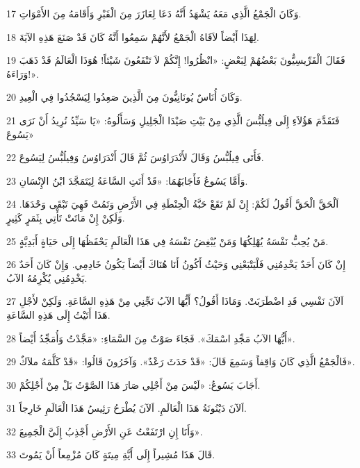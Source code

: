 \par 17 وَكَانَ الْجَمْعُ الَّذِي مَعَهُ يَشْهَدُ أَنَّهُ دَعَا لِعَازَرَ مِنَ الْقَبْرِ وَأَقَامَهُ مِنَ الأَمْوَاتِ.
\par 18 لِهَذَا أَيْضاً لاَقَاهُ الْجَمْعُ لأَنَّهُمْ سَمِعُوا أَنَّهُ كَانَ قَدْ صَنَعَ هَذِهِ الآيَةَ.
\par 19 فَقَالَ الْفَرِّيسِيُّونَ بَعْضُهُمْ لِبَعْضٍ: «انْظُرُوا! إِنَّكُمْ لاَ تَنْفَعُونَ شَيْئاً! هُوَذَا الْعَالَمُ قَدْ ذَهَبَ وَرَاءَهُ!».
\par 20 وَكَانَ أُنَاسٌ يُونَانِيُّونَ مِنَ الَّذِينَ صَعِدُوا لِيَسْجُدُوا فِي الْعِيدِ.
\par 21 فَتَقَدَّمَ هَؤُلاَءِ إِلَى فِيلُبُّسَ الَّذِي مِنْ بَيْتِ صَيْدَا الْجَلِيلِ وَسَأَلُوهُ: «يَا سَيِّدُ نُرِيدُ أَنْ نَرَى يَسُوعَ»
\par 22 فَأَتَى فِيلُبُّسُ وَقَالَ لأَنْدَرَاوُسَ ثُمَّ قَالَ أَنْدَرَاوُسُ وَفِيلُبُّسُ لِيَسُوعَ.
\par 23 وَأَمَّا يَسُوعُ فَأَجَابَهُمَا: «قَدْ أَتَتِ السَّاعَةُ لِيَتَمَجَّدَ ابْنُ الإِنْسَانِ.
\par 24 اَلْحَقَّ الْحَقَّ أَقُولُ لَكُمْ: إِنْ لَمْ تَقَعْ حَبَّةُ الْحِنْطَةِ فِي الأَرْضِ وَتَمُتْ فَهِيَ تَبْقَى وَحْدَهَا. وَلَكِنْ إِنْ مَاتَتْ تَأْتِي بِثَمَرٍ كَثِيرٍ.
\par 25 مَنْ يُحِبُّ نَفْسَهُ يُهْلِكُهَا وَمَنْ يُبْغِضُ نَفْسَهُ فِي هَذَا الْعَالَمِ يَحْفَظُهَا إِلَى حَيَاةٍ أَبَدِيَّةٍ.
\par 26 إِنْ كَانَ أَحَدٌ يَخْدِمُنِي فَلْيَتْبَعْنِي وَحَيْثُ أَكُونُ أَنَا هُنَاكَ أَيْضاً يَكُونُ خَادِمِي. وَإِنْ كَانَ أَحَدٌ يَخْدِمُنِي يُكْرِمُهُ الآبُ.
\par 27 اَلآنَ نَفْسِي قَدِ اضْطَرَبَتْ. وَمَاذَا أَقُولُ؟ أَيُّهَا الآبُ نَجِّنِي مِنْ هَذِهِ السَّاعَةِ. وَلَكِنْ لأَجْلِ هَذَا أَتَيْتُ إِلَى هَذِهِ السَّاعَةِ.
\par 28 أَيُّهَا الآبُ مَجِّدِ اسْمَكَ». فَجَاءَ صَوْتٌ مِنَ السَّمَاءِ: «مَجَّدْتُ وَأُمَجِّدُ أَيْضاً».
\par 29 فَالْجَمْعُ الَّذِي كَانَ وَاقِفاً وَسَمِعَ قَالَ: «قَدْ حَدَثَ رَعْدٌ». وَآخَرُونَ قَالُوا: «قَدْ كَلَّمَهُ ملاَكٌ».
\par 30 أَجَابَ يَسُوعُ: «لَيْسَ مِنْ أَجْلِي صَارَ هَذَا الصَّوْتُ بَلْ مِنْ أَجْلِكُمْ.
\par 31 اَلآنَ دَيْنُونَةُ هَذَا الْعَالَمِ. اَلآنَ يُطْرَحُ رَئِيسُ هَذَا الْعَالَمِ خَارِجاً.
\par 32 وَأَنَا إِنِ ارْتَفَعْتُ عَنِ الأَرْضِ أَجْذِبُ إِلَيَّ الْجَمِيعَ».
\par 33 قَالَ هَذَا مُشِيراً إِلَى أَيَّةِ مِيتَةٍ كَانَ مُزْمِعاً أَنْ يَمُوتَ.
